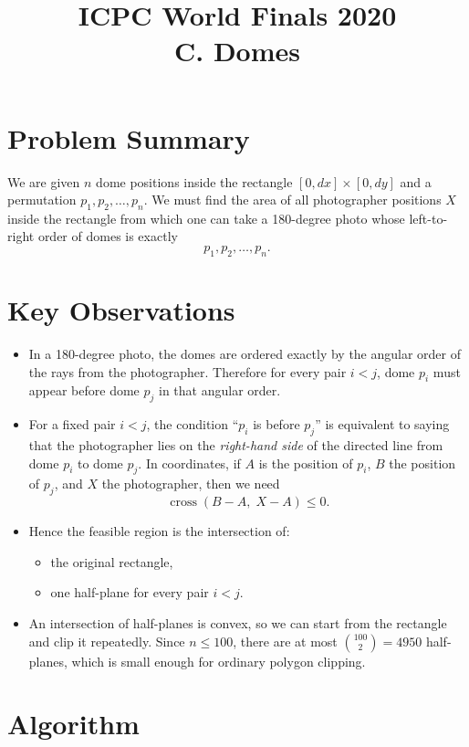 \documentclass[11pt]{article}
\title{ICPC World Finals 2020\\C. Domes}
\author{}
\date{}
\begin{document}
\maketitle

\section*{Problem Summary}

We are given $n$ dome positions inside the rectangle $[0,dx] \times [0,dy]$ and a permutation
$p_1, p_2, \dots, p_n$.
We must find the area of all photographer positions $X$ inside the rectangle from which one can take a
180-degree photo whose left-to-right order of domes is exactly
\[
    p_1, p_2, \dots, p_n.
\]

\section*{Key Observations}

\begin{itemize}[leftmargin=*]
    \item In a 180-degree photo, the domes are ordered exactly by the angular order of the rays from the photographer.
    Therefore for every pair $i < j$, dome $p_i$ must appear before dome $p_j$ in that angular order.
    \item For a fixed pair $i < j$, the condition ``$p_i$ is before $p_j$'' is equivalent to saying that the
    photographer lies on the \emph{right-hand side} of the directed line from dome $p_i$ to dome $p_j$.
    In coordinates, if $A$ is the position of $p_i$, $B$ the position of $p_j$, and $X$ the photographer, then we need
    \[
        \operatorname{cross}(B-A,\; X-A) \le 0.
    \]
    \item Hence the feasible region is the intersection of:
    \begin{itemize}[leftmargin=*]
        \item the original rectangle,
        \item one half-plane for every pair $i < j$.
    \end{itemize}
    \item An intersection of half-planes is convex, so we can start from the rectangle and clip it repeatedly.
    Since $n \le 100$, there are at most $\binom{100}{2} = 4950$ half-planes, which is small enough for ordinary
    polygon clipping.
\end{itemize}

\section*{Algorithm}
\end{document}
